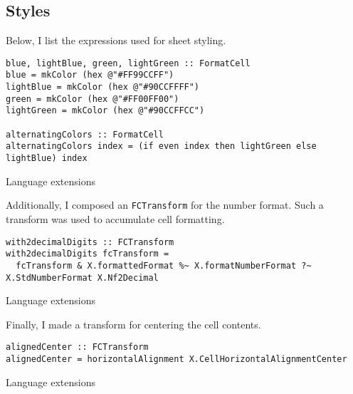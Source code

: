 \subsection{Styles}
\label{sec:styles}

Below, I list the expressions used for sheet styling.

\begin{listing}[!h]
  \begin{verbatim}
blue, lightBlue, green, lightGreen :: FormatCell
blue = mkColor (hex @"#FF99CCFF")
lightBlue = mkColor (hex @"#90CCFFFF")
green = mkColor (hex @"#FF00FF00")
lightGreen = mkColor (hex @"#90CCFFCC")

alternatingColors :: FormatCell
alternatingColors index = (if even index then lightGreen else lightBlue) index
\end{verbatim}
\caption{Language extensions}
\label{example3:extensions}
\end{listing}

Additionally, I composed an \texttt{FCTransform} for the number format.
Such a transform was used to accumulate cell formatting.

\begin{listing}[!h]
  \begin{verbatim}
with2decimalDigits :: FCTransform
with2decimalDigits fcTransform =
  fcTransform & X.formattedFormat %~ X.formatNumberFormat ?~ X.StdNumberFormat X.Nf2Decimal
\end{verbatim}
\caption{Language extensions}
\label{example3:extensions}
\end{listing}

Finally, I made a transform for centering the cell contents.

\begin{listing}[!h]
  \begin{verbatim}
alignedCenter :: FCTransform
alignedCenter = horizontalAlignment X.CellHorizontalAlignmentCenter
\end{verbatim}
\caption{Language extensions}
\label{example3:extensions}
\end{listing}
